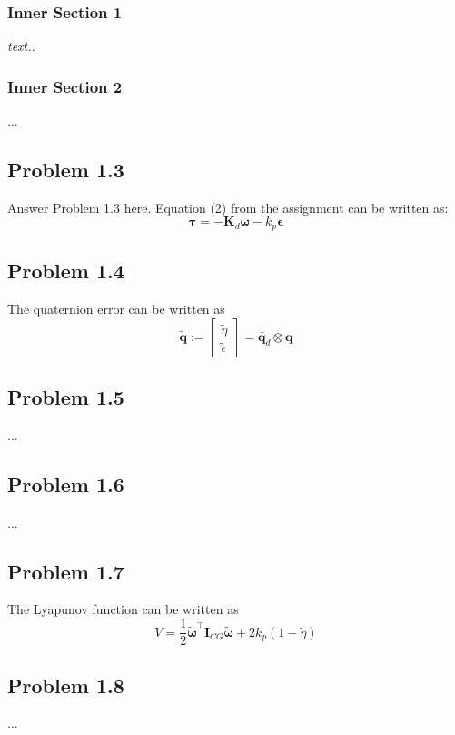 \subsubsection*{Inner Section 1}
\emph{text..}

\subsubsection*{Inner Section 2}
...

\subsection*{Problem 1.3}
Answer Problem 1.3 here. Equation (2) from the assignment can be written as: 
\begin{equation}
  \label{eq:tau}
  \mathbf{\tau} = -\mathbf{K}_d \boldsymbol{\omega} - k_p \boldsymbol{\epsilon}
\end{equation}

\subsection*{Problem 1.4}
The quaternion error can be written as
 \begin{equation}
	 \tilde{\mathbf{q}} := \left[
	 \begin{array}{c}
		 \tilde{\eta} \\
		 \tilde{\epsilon}
	 \end{array}
	 \right] = \bar{\mathbf{q}}_d \otimes \mathbf{q} 
 \end{equation}

\subsection*{Problem 1.5}
...

\subsection*{Problem 1.6}
...

\subsection*{Problem 1.7}
The Lyapunov function can be written as 
 \begin{equation}
	 V = \frac{1}{2} \tilde{\boldsymbol{\omega}}^{\top} \mathbf{I}_{CG}\tilde{\boldsymbol{\omega}} + 2 k_p (1-\tilde{\eta})
 \end{equation}

\subsection*{Problem 1.8}
...

